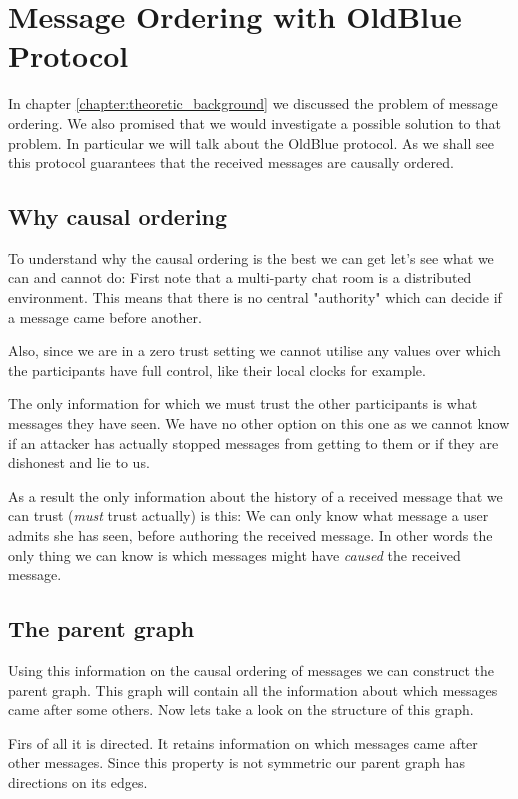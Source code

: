 \section{Message Ordering with OldBlue Protocol}
\label{section:ordering_with_oldblue}

In chapter \ref{chapter:theoretic_background} we discussed the problem of message ordering.
We also promised that we would investigate a possible solution to that problem.
In particular we will talk about the OldBlue protocol.
As we shall see this protocol guarantees that the received messages are causally ordered.

\subsection{Why causal ordering}

To understand why the causal ordering is the best we can get let's see what we can and cannot do:
First note that a multi-party chat room is a distributed environment.
This means that there is no central "authority" which can decide if a message came before another.

Also, since we are in a zero trust setting we cannot utilise any values over which the participants have full control, like their local clocks for example.

The only information for which we must trust the other participants is what messages they have seen.
We have no other option on this one as we cannot know if an attacker has actually stopped messages from getting to them or if they are dishonest and lie to us.

As a result the only information about the history of a received message that we can trust (\emph{must} trust actually) is this:
We can only know what message a user admits she has seen, before authoring the received message.
In other words the only thing we can know is which messages might have \emph{caused} the received message.

\subsection{The parent graph}

Using this information on the causal ordering of messages we can construct the parent graph.
This graph will contain all the information about which messages came after some others.
Now lets take a look on the structure of this graph.

Firs of all it is directed.
It retains information on which messages came after other messages.
Since this property is not symmetric our parent graph has directions on its edges.

